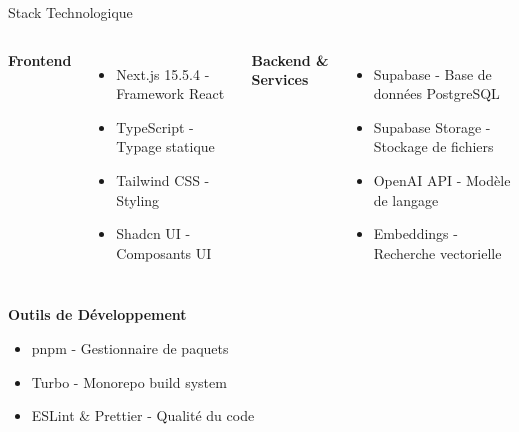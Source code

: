 \documentclass[aspectratio=169]{beamer}
\begin{document}
\begin{frame}{Stack Technologique}
    \begin{columns}
        \textbf{Frontend}
        \begin{itemize}
            \item \textcolor{primaryblue}{Next.js 15.5.4} - Framework React
            \item \textcolor{primaryblue}{TypeScript} - Typage statique
            \item \textcolor{primaryblue}{Tailwind CSS} - Styling
            \item \textcolor{primaryblue}{Shadcn UI} - Composants UI
        \end{itemize}
        
        \textbf{Backend \& Services}
        \begin{itemize}
            \item \textcolor{secondarypurple}{Supabase} - Base de données PostgreSQL
            \item \textcolor{secondarypurple}{Supabase Storage} - Stockage de fichiers
            \item \textcolor{secondarypurple}{OpenAI API} - Modèle de langage
            \item \textcolor{secondarypurple}{Embeddings} - Recherche vectorielle
        \end{itemize}
    \end{columns}
    
    \vspace{1cm}
    \textbf{Outils de Développement}
    \begin{itemize}
        \item pnpm - Gestionnaire de paquets
        \item Turbo - Monorepo build system
        \item ESLint \& Prettier - Qualité du code
    \end{itemize}
\end{frame}
\end{document}
